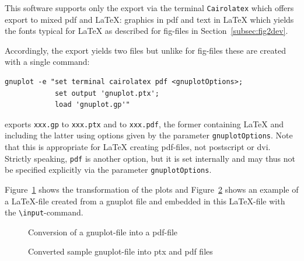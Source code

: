 \documentclass[12pt]{article}
\begin{document}
This software supports only the export via the terminal {\tt Cairolatex} 
which offers export to mixed pdf and \LaTeX: 
graphics in pdf and text in \LaTeX{}
which yields the fonts typical for \LaTeX{} 
as described for fig-files in Section~\ref{subsec:fig2dev}. 

Accordingly, the export yields two files 
but unlike for fig-files these are created with a single command: 
%
\begin{verbatim}
gnuplot -e "set terminal cairolatex pdf <gnuplotOptions>;
            set output 'gnuplot.ptx';
            load 'gnuplot.gp'"
\end{verbatim}
%
exports {\tt xxx.gp} to {\tt xxx.ptx} and to {\tt xxx.pdf}, 
the former containing \LaTeX{} and including the latter 
using options given by the parameter {\tt gnuplotOptions}. 
Note that this is appropriate for \LaTeX{} creating pdf-files, 
not postscript or \gls{dvi}. 
Strictly speaking, {\tt pdf} is another option, 
but it is set internally and may thus not be specified 
explicitly via the parameter {\tt gnuplotOptions}. 


Figure~\ref{fig:gp2pdf} shows the transformation of the plots 
and Figure~\ref{fig:gnuplot} shows an example of a \LaTeX-file 
created from a gnuplot file 
and embedded in this \LaTeX-file with the {\tt\textbackslash input}-command. 

\begin{figure}[htb]
\begin{center}

\end{center}
\caption{\label{fig:gp2pdf}Conversion of a gnuplot-file into a pdf-file}
\end{figure}

\begin{figure}[htb]
\begin{center}

\end{center}
\caption{\label{fig:gnuplot}
Converted sample gnuplot-file into ptx and pdf files }
\end{figure}
\end{document}
